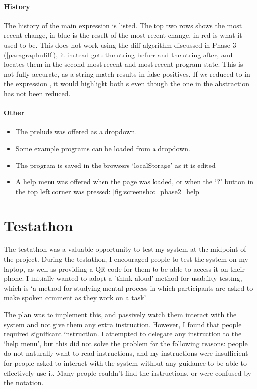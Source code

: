 \paragraph{History}
The history of the main expression is listed. The top two rows shows the most recent change, in blue is the result of the most recent change, in red is what it used to be. This does not work using the diff algorithm discussed in Phase 3 (\ref{paragraph:diff}), it instead gets the string before and the string after, and locates them in the second most recent and most recent program state. This is not fully accurate, as a string match results in false positives. If we reduced  to  in the expression , it would highlight both s even though the one in the abstraction has not been reduced. 

\paragraph{Other}

\begin{itemize}
    \item The prelude was offered as a dropdown.
    \item Some example programs can be loaded from a dropdown.  
    \item The program is saved in the browsers `localStorage' as it is edited
    \item A help menu was offered when the page was loaded, or when the `?' button in the top left corner was pressed: \ref{fig:screenshot_phase2_help}
\end{itemize}

\section{Testathon}
The testathon was a valuable opportunity to test my system at the midpoint of the project. During the testathon, I encouraged people to test the system on my laptop, as well as providing a QR code for them to be able to access it on their phone. I initially wanted to adopt a `think aloud' method for usability testing, which is `a method for studying mental process in which participants are asked to make spoken comment as they work on a task'\cite{thinkaloud}

The plan was to implement this, and passively watch them interact with the system and not give them any extra instruction. However, I found that people required significant instruction. I attempted to delegate any instruction to the `help menu', but this did not solve the problem for the following reasons: people do not naturally want to read instructions, and my instructions were insufficient for people asked to interact with the system without any guidance to be able to effectively use it. Many people couldn't find the instructions, or were confused by the notation.

